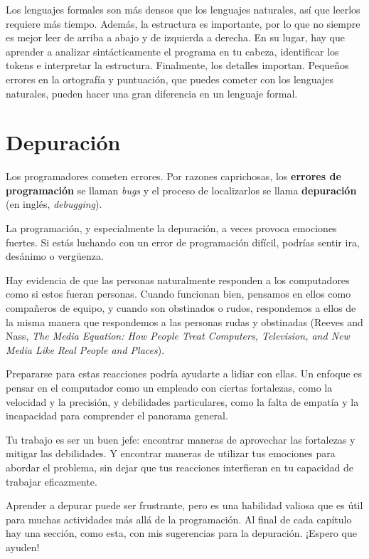 \documentclass[10pt]{book}
\begin{document}
Los lenguajes formales son más densos
que los lenguajes naturales, así que leerlos requiere más tiempo.  Además, la
estructura es importante, por lo que no siempre es mejor leer
de arriba a abajo y de izquierda a derecha.  En su lugar, hay que aprender a analizar
sintácticamente el programa en tu cabeza, identificar los tokens e interpretar
la estructura.  Finalmente, los detalles importan.  Pequeños errores en
la ortografía y puntuación, que puedes cometer
con los lenguajes naturales, pueden hacer una gran diferencia en un lenguaje
formal.


\section{Depuración}

Los programadores cometen errores.  Por razones caprichosas, los {\bf errores
de programación} se llaman {\em bugs} y el proceso de localizarlos se llama
{\bf depuración} (en inglés, {\em debugging}).

La programación, y especialmente la depuración, a veces provoca emociones
fuertes.  Si estás luchando con un error de programación difícil, podrías
sentir ira, desánimo o vergüenza.

Hay evidencia de que las personas naturalmente responden a los computadores
como si estos fueran personas.  Cuando funcionan bien, pensamos en ellos como
compañeros de equipo, y cuando son obstinados o rudos, respondemos a ellos
de la misma manera que respondemos a las personas rudas
y obstinadas (Reeves and Nass, {\it The Media
    Equation: How People Treat Computers, Television, and New Media
    Like Real People and Places}).

Prepararse para estas reacciones podría ayudarte a lidiar con ellas.
Un enfoque es pensar en el computador como un empleado con
ciertas fortalezas, como la velocidad y la precisión, y
debilidades particulares, como la falta de empatía y la incapacidad
para comprender el panorama general.

Tu trabajo es ser un buen jefe: encontrar maneras de aprovechar las
fortalezas y mitigar las debilidades.  Y encontrar maneras
de utilizar tus emociones para abordar el problema,
sin dejar que tus reacciones interfieran en tu capacidad
de trabajar eficazmente.

Aprender a depurar puede ser frustrante, pero es una habilidad valiosa
que es útil para muchas actividades más allá de la programación.  Al final
de cada capítulo hay una sección, como esta,
con mis sugerencias para la depuración.  ¡Espero que ayuden!
\end{document}
